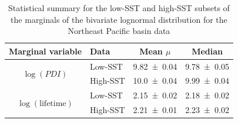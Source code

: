\begin{table}[H]
	\centering
	\begin{tabular}{clcc}
		\toprule
		\toprule
		Marginal variable & Data & Mean $\mu$            & Median \\
		\midrule
		\multirow{2}{*}{$\log(PDI)$}
		 & Low-SST               & \num{9.82 \pm 0.04} & \num{9.78 \pm 0.05} \\
		 & High-SST              & \num{10.0 \pm 0.04} & \num{9.99 \pm 0.04} \\
		\midrule
		\multirow{2}{*}{$\log(\text{lifetime})$}
		 & Low-SST               & \num{2.15 \pm 0.02} & \num{2.18 \pm 0.02} \\
		 & High-SST              & \num{2.21 \pm 0.01} & \num{2.23 \pm 0.02} \\
		\bottomrule
	\end{tabular}
	\caption{Statistical summary for the low-SST and high-SST subsets of the marginals of the bivariate lognormal distribution for the Northeast Pacific basin data}
	\label{tab:epac-marginals-stats}
\end{table}






